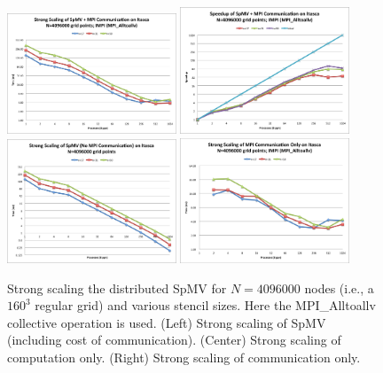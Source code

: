 \documentclass{report}
\begin{document}
\begin{figure} 
\centering
\includegraphics[width=0.45\textwidth]{performance_content/scaling/strong_scaling_4M_regular_alltoallv.png}  
\includegraphics[width=0.45\textwidth]{performance_content/scaling/strong_scaling_4M_regular_alltoallv_speedup.png} \\
\includegraphics[width=0.45\textwidth]{performance_content/scaling/strong_scaling_4M_regular_spmvOnly.png}
\includegraphics[width=0.45\textwidth]{performance_content/scaling/strong_scaling_4M_regular_alltoallv_commOnly.png} 
\caption{Strong scaling the distributed SpMV for $N=4096000$ nodes (i.e., a $160^3$ regular grid) and various stencil sizes. Here the MPI\_Alltoallv collective operation is used. (Left) Strong scaling of SpMV (including cost of communication). (Center) Strong scaling of computation only. (Right) Strong scaling of communication only.}
\end{figure}
\end{document}

